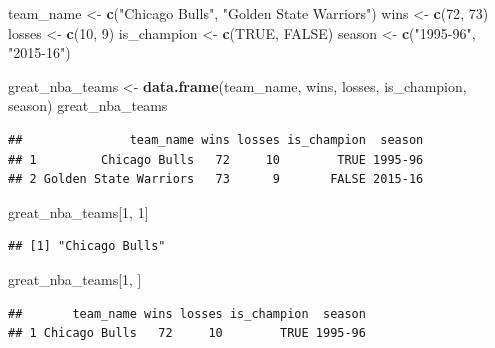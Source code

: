 \documentclass[
]{book}
\newenvironment{Shaded}{\begin{snugshade}}{\end{snugshade}}
\newcommand{\ConstantTok}[1]{\textcolor[rgb]{0.56,0.35,0.01}{#1}}
\newcommand{\DecValTok}[1]{\textcolor[rgb]{0.00,0.00,0.81}{#1}}
\newcommand{\FunctionTok}[1]{\textcolor[rgb]{0.13,0.29,0.53}{\textbf{#1}}}
\newcommand{\NormalTok}[1]{#1}
\newcommand{\OtherTok}[1]{\textcolor[rgb]{0.56,0.35,0.01}{#1}}
\newcommand{\StringTok}[1]{\textcolor[rgb]{0.31,0.60,0.02}{#1}}
\theoremstyle{definition}
\theoremstyle{definition}
\theoremstyle{definition}
\theoremstyle{definition}
\theoremstyle{remark}
\begin{document}
\begin{Shaded}
\begin{Highlighting}[]
\NormalTok{team\_name }\OtherTok{\textless{}{-}} \FunctionTok{c}\NormalTok{(}\StringTok{"Chicago Bulls"}\NormalTok{, }\StringTok{"Golden State Warriors"}\NormalTok{)}
\NormalTok{wins }\OtherTok{\textless{}{-}} \FunctionTok{c}\NormalTok{(}\DecValTok{72}\NormalTok{, }\DecValTok{73}\NormalTok{)}
\NormalTok{losses }\OtherTok{\textless{}{-}} \FunctionTok{c}\NormalTok{(}\DecValTok{10}\NormalTok{, }\DecValTok{9}\NormalTok{)}
\NormalTok{is\_champion }\OtherTok{\textless{}{-}} \FunctionTok{c}\NormalTok{(}\ConstantTok{TRUE}\NormalTok{, }\ConstantTok{FALSE}\NormalTok{)}
\NormalTok{season }\OtherTok{\textless{}{-}} \FunctionTok{c}\NormalTok{(}\StringTok{"1995{-}96"}\NormalTok{, }\StringTok{"2015{-}16"}\NormalTok{)}

\NormalTok{great\_nba\_teams }\OtherTok{\textless{}{-}} \FunctionTok{data.frame}\NormalTok{(team\_name, wins, losses, is\_champion, season)}
\NormalTok{great\_nba\_teams}
\end{Highlighting}
\end{Shaded}

\begin{verbatim}
##               team_name wins losses is_champion  season
## 1         Chicago Bulls   72     10        TRUE 1995-96
## 2 Golden State Warriors   73      9       FALSE 2015-16
\end{verbatim}

\begin{Shaded}
\begin{Highlighting}[]
\NormalTok{great\_nba\_teams[}\DecValTok{1}\NormalTok{, }\DecValTok{1}\NormalTok{]}
\end{Highlighting}
\end{Shaded}

\begin{verbatim}
## [1] "Chicago Bulls"
\end{verbatim}

\begin{Shaded}
\begin{Highlighting}[]
\NormalTok{great\_nba\_teams[}\DecValTok{1}\NormalTok{, ]}
\end{Highlighting}
\end{Shaded}

\begin{verbatim}
##       team_name wins losses is_champion  season
## 1 Chicago Bulls   72     10        TRUE 1995-96
\end{verbatim}
\end{document}
